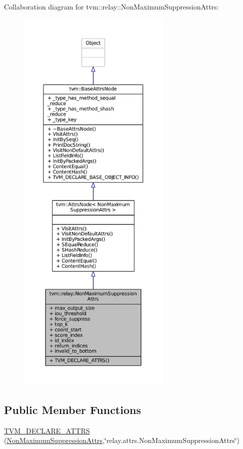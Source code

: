 Collaboration diagram for tvm\+:\+:relay\+:\+:Non\+Maximum\+Suppression\+Attrs\+:
\nopagebreak
\begin{figure}[H]
\begin{center}
\leavevmode
\includegraphics[height=550pt]{structtvm_1_1relay_1_1NonMaximumSuppressionAttrs__coll__graph}
\end{center}
\end{figure}
\subsection*{Public Member Functions}
\begin{DoxyCompactItemize}
\item 
\hyperlink{structtvm_1_1relay_1_1NonMaximumSuppressionAttrs_ac090be62277626ac340b079a0b3523c7}{T\+V\+M\+\_\+\+D\+E\+C\+L\+A\+R\+E\+\_\+\+A\+T\+T\+RS} (\hyperlink{structtvm_1_1relay_1_1NonMaximumSuppressionAttrs}{Non\+Maximum\+Suppression\+Attrs},\char`\"{}relay.\+attrs.\+Non\+Maximum\+Suppression\+Attrs\char`\"{})
\end{DoxyCompactItemize}

